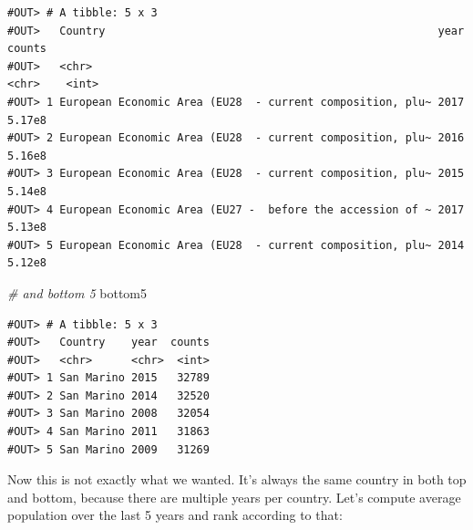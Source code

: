 \documentclass[]{book}
\newenvironment{Shaded}{\begin{snugshade}}{\end{snugshade}}
\newcommand{\KeywordTok}[1]{\textcolor[rgb]{0.13,0.29,0.53}{\textbf{#1}}}
\newcommand{\DataTypeTok}[1]{\textcolor[rgb]{0.13,0.29,0.53}{#1}}
\newcommand{\DecValTok}[1]{\textcolor[rgb]{0.00,0.00,0.81}{#1}}
\newcommand{\StringTok}[1]{\textcolor[rgb]{0.31,0.60,0.02}{#1}}
\newcommand{\CommentTok}[1]{\textcolor[rgb]{0.56,0.35,0.01}{\textit{#1}}}
\newcommand{\OperatorTok}[1]{\textcolor[rgb]{0.81,0.36,0.00}{\textbf{#1}}}
\newcommand{\NormalTok}[1]{#1}
\theoremstyle{definition}
\theoremstyle{definition}
\theoremstyle{definition}
\theoremstyle{remark}
\begin{document}
\begin{verbatim}
#OUT> # A tibble: 5 x 3
#OUT>   Country                                                   year    counts
#OUT>   <chr>                                                     <chr>    <int>
#OUT> 1 European Economic Area (EU28  - current composition, plu~ 2017    5.17e8
#OUT> 2 European Economic Area (EU28  - current composition, plu~ 2016    5.16e8
#OUT> 3 European Economic Area (EU28  - current composition, plu~ 2015    5.14e8
#OUT> 4 European Economic Area (EU27 -  before the accession of ~ 2017    5.13e8
#OUT> 5 European Economic Area (EU28  - current composition, plu~ 2014    5.12e8
\end{verbatim}

\begin{Shaded}
\begin{Highlighting}[]
\CommentTok{# and bottom 5}
\NormalTok{bottom5}
\end{Highlighting}
\end{Shaded}

\begin{verbatim}
#OUT> # A tibble: 5 x 3
#OUT>   Country    year  counts
#OUT>   <chr>      <chr>  <int>
#OUT> 1 San Marino 2015   32789
#OUT> 2 San Marino 2014   32520
#OUT> 3 San Marino 2008   32054
#OUT> 4 San Marino 2011   31863
#OUT> 5 San Marino 2009   31269
\end{verbatim}

Now this is not exactly what we wanted. It's always the same country in
both top and bottom, because there are multiple years per country. Let's
compute average population over the last 5 years and rank according to
that:

\begin{Shaded}
\end{Shaded}
\end{document}
